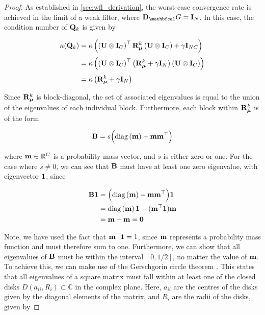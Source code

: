 \begin{proof}
    As established in \cref{sec:wfl_derivation}, the worst-case convergence rate is achieved in the limit of a weak filter, where $\D_\Gt = \I_N$. In this case, the condition number of $\mathbf{Q}_k$ is given by 

    \begin{align*}
        \kappa(\mathbf{Q}_k) &= \kappa\left( \left(\mathbf{U} \otimes \mathbf{I}_C\right)^\top \mathbf{R}_{\boldsymbol{\mu}}^k \left(\mathbf{U} \otimes \mathbf{I}_C\right) + \gamma \mathbf{I}_{NC}\right) \\[0.1cm]
        &=  \kappa\left( \left(\mathbf{U} \otimes \mathbf{I}_C\right)^\top \left(\mathbf{R}_{\boldsymbol{\mu}}^k + \gamma \mathbf{I}_N\right) \left(\mathbf{U} \otimes \mathbf{I}_C\right)  \right) \\[0.1cm]
        &= \kappa\left( \mathbf{R}_{\boldsymbol{\mu}}^k + \gamma \mathbf{I}_N\right)
    \end{align*}

    Since $\mathbf{R}_{\boldsymbol{\mu}}^k$ is block-diagonal, the set of associated eigenvalues is equal to the union of the eigenvalues of each individual block. Furthermore, each block within  $\mathbf{R}_{\boldsymbol{\mu}}^k$ is of the form

    \begin{equation*}
        \mathbf{B} = s \Big(\text{\textup{diag}}\left(\mathbf{m}\right) - \mathbf{m} \mathbf{m}^\top\Big)
    \end{equation*}
    
    where $\mathbf{m} \in \mathbb{R}^C$ is a probability mass vector, and $s$ is either zero or one. For the case where $s \neq 0$, we can see that $\mathbf{B}$ must have at least one zero eigenvalue, with eigenvector $\mathbf{1}$, since   

    \begin{align*}
        \mathbf{B} \mathbf{1} &= \Big(\text{\textup{diag}}\left(\mathbf{m}\right) - \mathbf{m} \mathbf{m}^\top\Big) \mathbf{1} \\
        &= \text{\textup{diag}}\left(\mathbf{m}\right) \mathbf{1} - (\mathbf{m}^\top \mathbf{1}) \mathbf{m} \\
        &= \mathbf{m} - \mathbf{m} = \mathbf{0}
    \end{align*}

    Note, we have used the fact that $\mathbf{m}^\top \mathbf{1} = 1$, since $\mathbf{m}$ represents a probability mass function and must therefore sum to one. Furthermore, we can show that all eigenvalues of $\mathbf{B}$ must be within the interval $[0, 1/2]$, no matter the value of $\mathbf{m}$.  To achieve this, we can make use of the Gerschgorin circle theorem \citep{Gerschgorin1931}. This states that all eigenvalues of a square matrix must fall within at least one of the closed disks $D(a_{ii}, R_i) \subset \mathbb{C}$ in the complex plane. Here, $a_{ii}$ are the centres of the disks given by the diagonal elements of the matrix, and $R_i$ are the radii of the disks, given by 


\end{proof}
